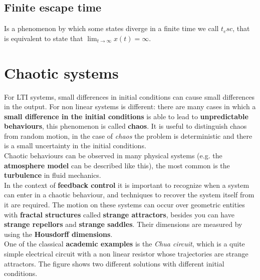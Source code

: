 \subsection{Finite escape time}
Is a phenomenon by which some states diverge in a finite time we call $t_esc$, that is equivalent to state that $\lim_{t\to\infty}x(t)=\infty$.

\section {Chaotic systems}
For LTI systems, small differences in initial conditions can cause small differences in the output. For non linear systems is different: there are many cases in which a \textbf{small difference in the initial conditions} is able to lead to \textbf{unpredictable behaviours}, this phenomenon is called \textbf{chaos}. It is useful to distinguish chaos from random motion, in the case of \textit{chaos} the problem is deterministic and there is a small uncertainty in the initial conditions.\\
Chaotic behaviours can be observed in many physical systems (e.g. the \textbf{atmosphere model} can be described like this), the most common is the \textbf{turbulence} in fluid mechanics.\\
In the context of \textbf{feedback control} it  is important to recognize when a system can enter in a chaotic behaviour, and techniques to recover the system itself from it are required.
The motion on these systems can occur over geometric entities with \textbf{fractal structures} called \textbf{strange attractors}, besides you can have \textbf{strange repellors} and \textbf{strange saddles}. Their dimensions are measured by using the \textbf{Housdorff dimensions}. \\

One of the classical \textbf{academic examples} is the \textit{Chua circuit}, which is a quite simple electrical circuit with a non linear resistor whose trajectories are strange attractors. The figure shows two different solutions with different initial conditions.

